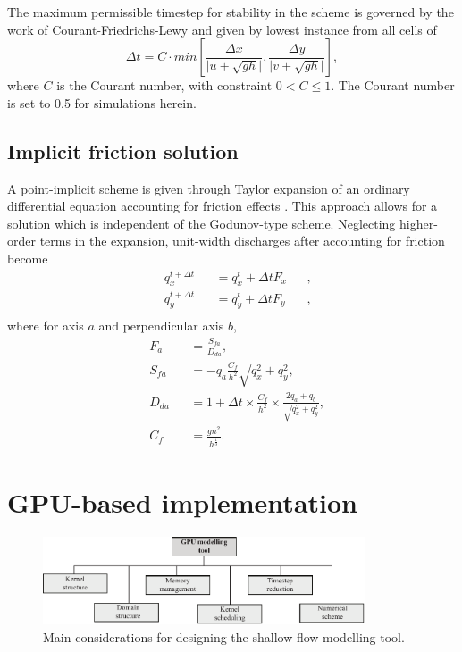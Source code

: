 \documentclass[11pt,english,a4paper]{article}
\begin{document}
The maximum permissible timestep for stability in the scheme is governed by the work of Courant-Friedrichs-Lewy \cite{Courant_67} and given by lowest instance from all cells of
\begin{equation}
	\label{CFL}
	\Delta t = C \cdot min \left[\frac{\Delta x}{\lvert u + \sqrt{gh} \rvert} , \frac{\Delta y}{\lvert v + \sqrt{gh} \rvert}\right] ,
\end{equation}
where \(C\) is the Courant number, with constraint \(0 < C \le 1\). The Courant number is set to 0.5 for simulations herein. 

\subsection{Implicit friction solution}

A point-implicit scheme is given through Taylor expansion of an ordinary differential equation accounting for friction effects \cite{Liang_10}. This approach allows for a solution which is independent of the Godunov-type scheme. Neglecting higher-order terms in the expansion, unit-width discharges after accounting for friction become
\begin{equation}
	\label{Friction}
	\begin{alignedat}{3}
		&q_{x}^{t+\Delta t} && = q_{x}^{t} + \Delta tF_x && ,\\
		&q_{y}^{t+\Delta t} && = q_{y}^{t} + \Delta tF_y && ,\\
	\end{alignedat}
\end{equation}
where for axis \(a\) and perpendicular axis \(b\),
\begin{equation}
	\label{FrictionPrereq}
	\begin{alignedat}{2}
		&F_a      && = \frac{S_{fa}}{D_{da}} ,\\
		&S_{fa}   && = -q_a\frac{C_f}{h^2}\sqrt{q_{x}^{2} + q_{y}^{2}} ,\\
		&D_{da}   && = 1 + \Delta t \times \frac{C_f}{h^2} \times \frac{2q_a + q_b}{\sqrt{q_{x}^{2} + q_{y}^{2}}} ,\\
		&C_f      && = \frac{gn^2}{h^{\frac{1}{3}}} .
	\end{alignedat}
\end{equation}

\section{GPU-based implementation}

\begin{figure}[tb]
\centering
\includegraphics[width=0.85\textwidth]{Figure_1_Greyscale.pdf}
\caption{Main considerations for designing the shallow-flow modelling tool.}
\label{ModelComponents}
\end{figure}
\end{document}
